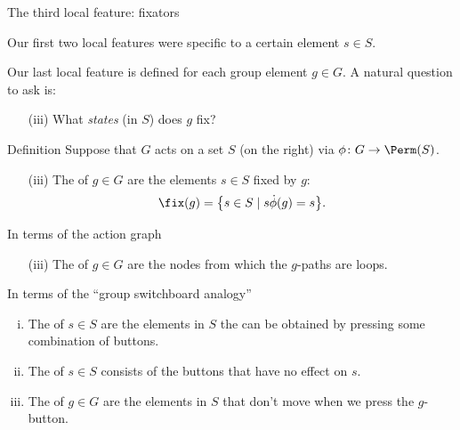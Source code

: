 \documentclass[8pt, handout]{beamer}
\newcommand{\Pause}{}      %
\begin{document}
\begin{frame}{The third local feature: fixators} %
  
  Our first two local features were specific to a certain element
  $s\in S$. \medskip\Pause

  Our last local feature is defined for each group element $g\in
  G$. \Pause A natural question to ask is:
  
  \begin{enumerate}
  \item[(iii)] What \emph{states} (in $S$) does $g$ fix?
  \end{enumerate}
  
  \Pause
  
  \begin{block}{Definition}
    Suppose that $G$ acts on a set $S$ (on the right)
    via $\phi\colon G\to\Perm(S)$.  \smallskip\Pause
    \begin{itemize}
    \item[(iii)] The  of $g\in G$ are       
      the elements $s\in S$ fixed by $g$:
      \[
      \fix(g)=\big\{s\in S\mid s\Dot\phi(g)=s\big\}.
      \]
    \end{itemize}
  \end{block}
  
  \Pause
  
  \begin{exampleblock}{In terms of the action graph}
    \begin{enumerate}
    \item[(iii)] The  of $g\in G$ are the nodes
      from which the $g$-paths are loops.
    \end{enumerate}
  \end{exampleblock}
  
  \Pause
  
  \begin{exampleblock}{In terms of the ``group switchboard analogy''}
    \begin{enumerate}[(i)]
    \item The  of $s\in S$ are the elements in $S$ the
      can be obtained by pressing some combination of buttons. \Pause
    \item The  of $s\in S$ consists of the buttons
      that have no effect on $s$. \Pause
    \item The  of $g\in G$ are the elements in
      $S$ that don't move when we press the $g$-button.
    \end{enumerate}
  \end{exampleblock}
  
\end{frame}
\end{document}
